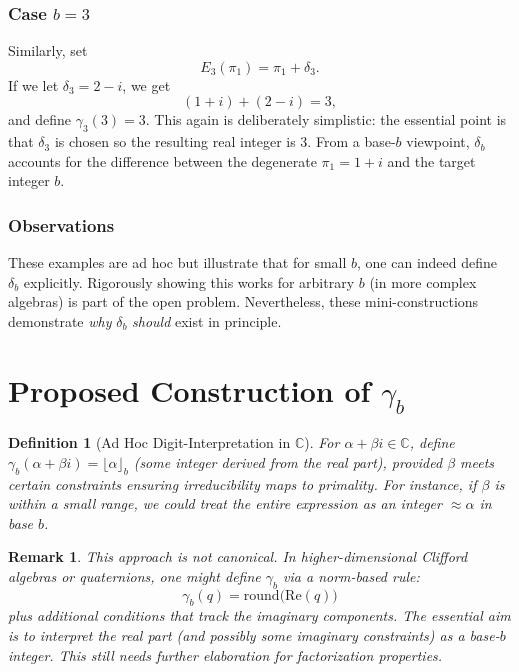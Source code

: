 \documentclass[11pt]{article}
\newtheorem{definition}{Definition}
\newtheorem{remark}{Remark}
\begin{document}
\subsubsection{Case \texorpdfstring{$b=3$}{b=3}}
Similarly, set
\[
  E_3(\pi_1) = \pi_1 + \delta_3.
\]
If we let $\delta_3 = 2 - i$, we get
\[
  (1 + i) + (2 - i) = 3,
\]
and define $\gamma_3(3) = 3$. This again is deliberately simplistic: 
the essential point is that $\delta_3$ is chosen so the resulting real integer is 3. 
From a base-$b$ viewpoint, $\delta_b$ accounts for the difference 
between the degenerate $\pi_1 = 1 + i$ and the target integer $b$.

\subsubsection{Observations}
These examples are ad hoc but illustrate that for small $b$, 
one can indeed define $\delta_b$ explicitly. Rigorously showing this works 
for arbitrary $b$ (in more complex algebras) is part of the open problem. 
Nevertheless, these mini-constructions demonstrate \emph{why} $\delta_b$ 
\emph{should} exist in principle.

\section{Proposed Construction of \texorpdfstring{$\gamma_b$}{gb}}
\label{sec:GammaB}
\begin{definition}[Ad Hoc Digit-Interpretation in $\mathbb{C}$]
For $\alpha + \beta i \in \mathbb{C}$, define 
$\gamma_b(\alpha + \beta i) = \lfloor \alpha \rfloor_b$ 
(some integer derived from the real part), 
provided $\beta$ meets certain constraints ensuring irreducibility 
maps to primality. For instance, if $\beta$ is within a small range, 
we could treat the entire expression as an integer $\approx \alpha$ 
in base $b$. 
\end{definition}

\begin{remark}
This approach is not canonical. 
In higher-dimensional Clifford algebras or quaternions, one might define 
$\gamma_b$ via a norm-based rule:
\[
  \gamma_b(q) = \text{round}\bigl(\mathrm{Re}(q)\bigr) 
\]
plus additional conditions that track the imaginary components. 
The essential aim is to interpret the real part (and possibly 
some imaginary constraints) as a base-$b$ integer. 
This still needs further elaboration for factorization properties.
\end{remark}
\end{document}

